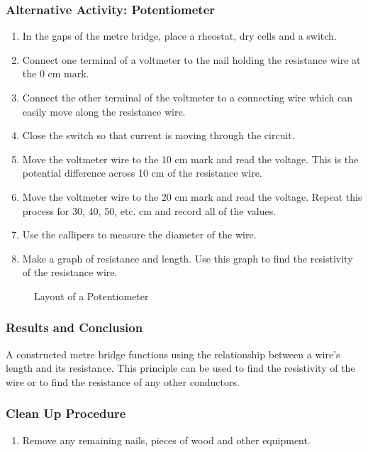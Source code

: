 \subsubsection{Alternative Activity: Potentiometer}
\begin{enumerate}
\item{In the gaps of the metre bridge, place a rheostat, dry cells and a switch.} 
\item{Connect one terminal of a voltmeter to the nail holding the resistance wire at the 0 cm mark.} 
\item{Connect the other terminal of the voltmeter to a connecting wire which can easily move along the resistance wire.} 
\item{Close the switch so that current is moving through the circuit.} 
\item{Move the voltmeter wire to the 10 cm mark and read the voltage. This is the potential difference across 10 cm of the resistance wire.} 
\item{Move the voltmeter wire to the 20 cm mark and read the voltage. Repeat this process for 30, 40, 50, etc. cm and record all of the values.} 
\item{Use the callipers to measure the diameter of the wire.} 
\item{Make a graph of resistance and length. Use this graph to find the resistivity of the resistance wire.} 
\end{enumerate}

\begin{figure}
\begin{center}
\def\svgwidth{300pt}

\caption{Layout of a Potentiometer}
\label{fig:potential-metre}
\end{center}
\end{figure}

\subsubsection*{Results and Conclusion}
A constructed metre bridge functions using the relationship between a wire's length and its resistance. This principle can be used to find the resistivity of the wire or to find the resistance of any other conductors.  

\subsubsection*{Clean Up Procedure}
\begin{enumerate}
\item{Remove any remaining nails, pieces of wood and other equipment.} 
\end{enumerate}

